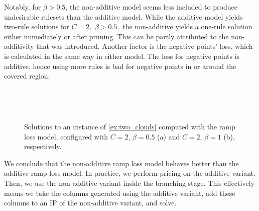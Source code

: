 \begin{example}
    Notably, for $\beta > 0.5$, the non-additive model seems less included to produce undesirable rulesets than the additive model.
    While the additive model yields two-rule solutions for $C=2,$ $\beta>0.5,$
    the non-additive yields a one-rule solution either immediately or after pruning.
    This can be partly attributed to the non-additivity that was introduced.
    Another factor is the negative points' loss, which is calculated in the same way in either model.
    The loss for negative points is additive, hence using more rules is bad for negative points in or around the covered region.

    \begin{figure}
    \centering
    \begin{subfigure}{.48\textwidth}
        \centering
        
        \caption{}
        \label{fig:two_clouds_nonadditive_solution_bad_a}
    \end{subfigure}
    \hfill
    \begin{subfigure}{.48\textwidth}
        \centering
        
        \caption{}
        \label{fig:two_clouds_nonadditive_solution_bad_b}
    \end{subfigure} \\
        \begin{subfigure}{.48\textwidth}
        \centering
        
        \caption{}
        \label{fig:two_clouds_nonadditive_solution_bad_c}
    \end{subfigure} \\
    \caption{Solutions to an instance of \autoref{ex:two_clouds} computed with the ramp loss model, configured with $C=2$, $\beta=0.5$ (a) and $C=2$, $\beta=1$ (b), respectively.}
    \label{fig:two_clouds_nonadditive_solution_bad}
\end{figure}

\end{example}

We conclude that the non-additive ramp loss model behaves better than the additive ramp loss model.
In practice, we perform pricing on the additive variant.
Then, we use the non-additive variant inside the branching stage.
This effectively means we take the columns generated using the additive variant,
add these columns to an IP of the non-additive variant, and solve.